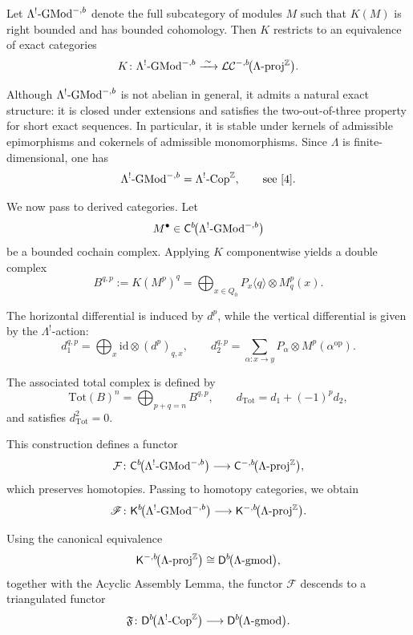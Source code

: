 \documentclass[11pt]{article}
\theoremstyle{definition}
\theoremstyle{remark}
\begin{document}
Let \(\Lambda^{!}\textup{-GMod}^{-,b}\) denote the full subcategory of modules \(M\) such that \(K(M)\) is right bounded and has bounded cohomology. Then \(K\) restricts to an equivalence of exact categories
\[
K \colon \Lambda^{!}\textup{-GMod}^{-,b}
\xrightarrow{\;\sim\;}
\mathcal{LC}^{-,b}\!\bigl(\Lambda\textup{-proj}^{\mathbb{Z}}\bigr).
\]

Although \(\Lambda^{!}\textup{-GMod}^{-,b}\) is not abelian in general, it admits a natural exact structure: it is closed under extensions and satisfies the two-out-of-three property for short exact sequences. In particular, it is stable under kernels of admissible epimorphisms and cokernels of admissible monomorphisms. Since \(\Lambda\) is finite-dimensional, one has
\[
\Lambda^{!}\textup{-GMod}^{-,b} = \Lambda^{!}\textup{-Cop}^{\mathbb{Z}},
\qquad \text{see~\cite{4}}.
\]

\medskip

We now pass to derived categories. Let
\[
M^{\bullet} \in \mathsf{C}^{b}\!\bigl(\Lambda^{!}\textup{-GMod}^{-,b}\bigr)
\]
be a bounded cochain complex. Applying \(K\) componentwise yields a double complex
\[
B^{q,p} := K(M^{p})^{q}
= \bigoplus_{x\in Q_{0}} P_{x}\langle q\rangle \otimes M^{p}_{q}(x).
\]

The horizontal differential is induced by \(d^{p}\), while the vertical differential is given by the \(\Lambda^{!}\)-action:
\[
d_{1}^{q,p} =
\bigoplus_{x} \mathrm{id} \otimes (d^{p})_{q,x},
\qquad
d_{2}^{q,p} =
\sum_{\alpha\colon x \to y}
P_{\alpha} \otimes M^{p}(\alpha^{\mathrm{op}}).
\]

The associated total complex is defined by
\[
\mathrm{Tot}(B)^{n} = \bigoplus_{p+q=n} B^{q,p},
\qquad
d_{\mathrm{Tot}} = d_{1} + (-1)^{p} d_{2},
\]
and satisfies \(d_{\mathrm{Tot}}^{2}=0\).

\medskip

This construction defines a functor
\[
\mathcal{F}\colon
\mathsf{C}^{b}\!\bigl(\Lambda^{!}\textup{-GMod}^{-,b}\bigr)
\longrightarrow
\mathsf{C}^{-,b}\!\bigl(\Lambda\textup{-proj}^{\mathbb{Z}}\bigr),
\]
which preserves homotopies. Passing to homotopy categories, we obtain
\[
\mathscr{F}\colon
\mathsf{K}^{b}\!\bigl(\Lambda^{!}\textup{-GMod}^{-,b}\bigr)
\longrightarrow
\mathsf{K}^{-,b}\!\bigl(\Lambda\textup{-proj}^{\mathbb{Z}}\bigr).
\]

Using the canonical equivalence
\[
\mathsf{K}^{-,b}\!\bigl(\Lambda\textup{-proj}^{\mathbb{Z}}\bigr)
\cong
\mathsf{D}^{b}\!\bigl(\Lambda\textup{-gmod}\bigr),
\]
together with the Acyclic Assembly Lemma, the functor \(\mathscr{F}\) descends to a triangulated functor
\[
\mathfrak{F}\colon
\mathsf{D}^{b}\!\bigl(\Lambda^{!}\textup{-Cop}^{\mathbb{Z}}\bigr)
\longrightarrow
\mathsf{D}^{b}\!\bigl(\Lambda\textup{-gmod}\bigr).
\]
\end{document}
